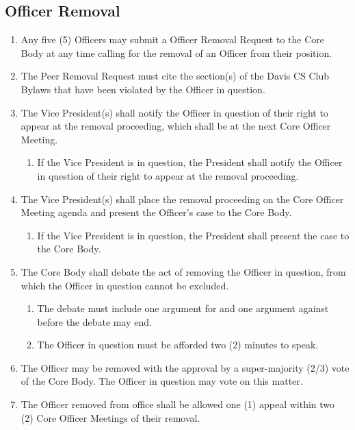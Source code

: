 \documentclass{article}
\newenvironment{li}{
\begin{enumerate}
  \setlength{\itemsep}{1pt}
  \setlength{\parskip}{0pt}
  \setlength{\parsep}{0pt}
}{\end{enumerate}}
\begin{document}
\subsection{Officer Removal}
\begin{li}
\item Any five (5) Officers may submit a Officer Removal Request to the Core Body at any time calling for the removal of an Officer from their position.
\item The Peer Removal Request must cite the section(s) of the Davis CS Club Bylaws that have been violated by the Officer in question.
\item The Vice President(s) shall notify the Officer in question of their right to appear at the removal proceeding, which shall be at the next Core Officer Meeting.
	\begin{li}
	\item If the Vice President is in question, the President shall notify the Officer in question of their right to appear at the removal proceeding.
	\end{li}
\item The Vice President(s) shall place the removal proceeding on the Core Officer Meeting agenda and present the Officer's case to the Core Body.
	\begin{li}
	\item If the Vice President is in question, the President shall present the case to the Core Body.
	\end{li}
\item The Core Body shall debate the act of removing the Officer in question, from which the Officer in question cannot be excluded.
	\begin{li}
	\item The debate must include one argument for and one argument against before the debate may end.
	\item The Officer in question must be afforded two (2) minutes to speak.
	\end{li}
\item The Officer may be removed with the approval by a super-majority (2/3) vote of the Core Body. The Officer in question may vote on this matter.
\item The Officer removed from office shall be allowed one (1) appeal within two (2) Core Officer Meetings of their removal.
\end{li}
\end{document}
